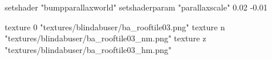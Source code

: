 	setshader "bumpparallaxworld"
	setshaderparam "parallaxscale" 0.02 -0.01

		texture 0 "textures/blindabuser/ba_rooftile03.png"
		texture n "textures/blindabuser/ba_rooftile03_nm.png"
		texture z "textures/blindabuser/ba_rooftile03_hm.png"
